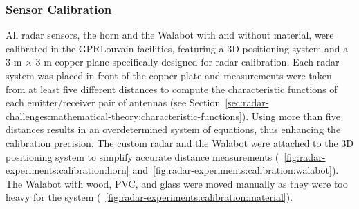 \subsubsection{Sensor Calibration}
All radar sensors, \ie the horn and the Walabot with and without material, were calibrated in the GPRLouvain facilities, featuring a 3D positioning system and a 3 m $\times$ 3 m copper plane specifically designed for radar calibration. Each radar system was placed in front of the copper plate and measurements were taken from at least five different distances to compute the characteristic functions of each emitter/receiver pair of antennas (see Section~\ref{sec:radar-challenges:mathematical-theory:characteristic-functions}). Using more than five distances results in an overdetermined system of equations, thus enhancing the calibration precision.
The custom radar and the Walabot were attached to the 3D positioning system to simplify accurate distance measurements (\fig~\ref{fig:radar-experiments:calibration:horn} and~\ref{fig:radar-experiments:calibration:walabot}). The Walabot with wood, PVC, and glass were moved manually as they were too heavy for the system (\fig~\ref{fig:radar-experiments:calibration:material}).
